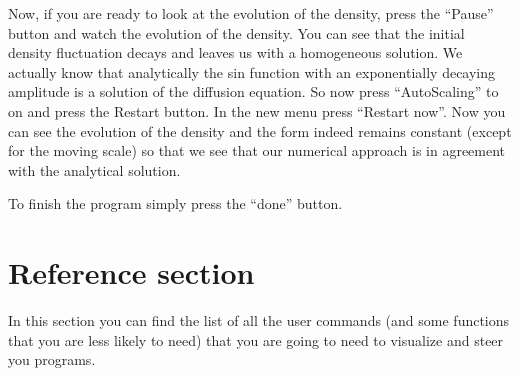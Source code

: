 \documentclass[12pt,letterpaper]{article}
\begin{document}
Now, if you are ready to look at the evolution of the density, press
the ``Pause'' button and watch the evolution of the density. You can
see that the initial density fluctuation decays and leaves us with a
homogeneous solution. We actually know that analytically the sin
function with an exponentially decaying amplitude is a solution of the
diffusion equation. So now press ``AutoScaling'' to on and
press the Restart button. In the new menu press ``Restart now''. Now
you can see the evolution of the density and the form indeed remains
constant (except for the moving scale) so that we see that our
numerical approach is in agreement with the analytical solution.

To finish the program simply press the ``done'' button.

\section{Reference section}
\label{graphs}
In this section you can find the list of all the user commands (and
some functions that you are less likely to need) that you are going to
need to visualize and steer you programs. 

\end{document}
